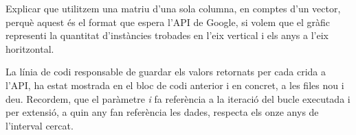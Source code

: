Explicar que utilitzem una matriu d'una sola columna, en comptes d'un vector, perquè aquest és el format que espera l'API de Google, si volem que el gràfic representi la quantitat d'instàncies trobades en l'eix vertical i els anys a l'eix horitzontal.

La línia de codi responsable de guardar els valors retornats per cada crida a l’API, ha estat mostrada en el bloc de codi anterior i en concret, a les files nou i deu. Recordem, que el paràmetre \emph{i} fa referència a la iteració del bucle executada i per extensió, a quin any fan referència les dades, respecta els onze anys de l’interval cercat.
